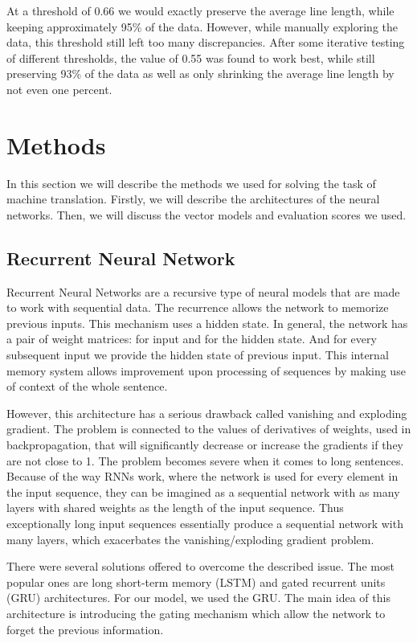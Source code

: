 \documentclass{article}
\begin{document}
At a threshold of 0.66 we would exactly preserve the average line length, while keeping approximately 95\% of the data. However, while manually exploring the data, this threshold still left too many discrepancies. After some iterative testing of different thresholds, the value of 0.55 was found to work best, while still preserving 93\% of the data as well as only shrinking the average line length by not even one percent.

\section*{Methods}

In this section we will describe the methods we used for solving the task of machine translation. Firstly, we will describe the architectures of the neural networks. Then, we will discuss the vector models and evaluation scores we used.

\subsection*{Recurrent Neural Network}

Recurrent Neural Networks are a recursive type of neural models that are made to work with sequential data. The recurrence allows the network to memorize previous inputs. This mechanism uses a hidden state. In general, the network has a pair of weight matrices: for input and for the hidden state. And for every subsequent input we provide the hidden state of previous input. This internal memory system allows improvement upon processing of sequences by making use of context of the whole sentence.

However, this architecture has a serious drawback called vanishing and exploding gradient. The problem is connected to the values of derivatives of weights, used in backpropagation, that will significantly decrease or increase the gradients if they are not close to 1. The problem becomes severe when it comes to long sentences. Because of the way RNNs work, where the network is used for every element in the input sequence, they can be imagined as a sequential network with as many layers with shared weights as the length of the input sequence. Thus exceptionally long input sequences essentially produce a sequential network with many layers, which exacerbates the vanishing/exploding gradient problem.

There were several solutions offered to overcome the described issue. The most popular ones are long short-term memory (LSTM) \cite{Schmidhuber1997} and gated recurrent units (GRU) \cite{Cho2014} architectures. For our model, we used the GRU. The main idea of this architecture is introducing the gating mechanism which allow the network to forget the previous information.
\end{document}
